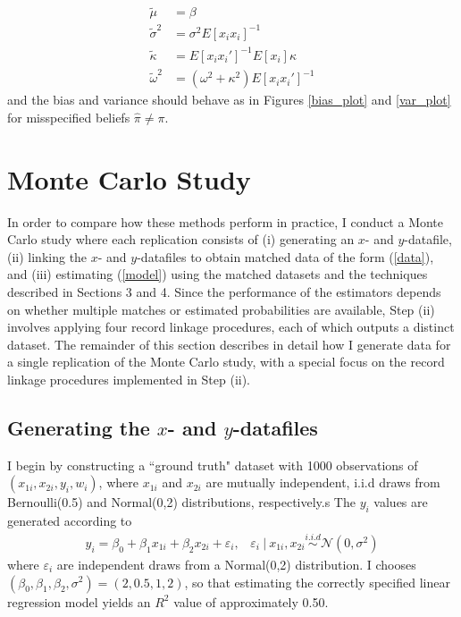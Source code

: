 \documentclass[12pt]{article}
\begin{document}
\begin{align*}
\tilde{\mu} &= \beta \\
\tilde{\sigma}^2 &=  \sigma^2 E[x_ix_i]^{-1}\\
\tilde{\kappa} &= E[x_ix_i']^{-1}E[x_i]\kappa \\
\tilde{\omega}^2 &= (\omega^2 + \kappa^2)E[x_ix_i']^{-1}
\end{align*}
and the bias and variance should behave as in Figures \ref{bias_plot} and \ref{var_plot} for misspecified beliefs $\hat{\pi} \neq \pi$.

\section{Monte Carlo Study}

In order to compare how these methods perform in practice, I conduct a Monte Carlo study where each replication consists of (i) generating an $x$- and $y$-datafile, (ii) linking the $x$- and $y$-datafiles to obtain matched data of the form (\ref{data}), and (iii) estimating (\ref{model}) using the matched datasets and the techniques described in Sections 3 and 4.  Since the performance of the estimators depends on whether multiple matches or estimated probabilities are available, Step (ii) involves applying four record linkage procedures, each of which outputs a distinct dataset.  The remainder of this section describes in detail how I generate data for a single replication of the Monte Carlo study, with a special focus on the record linkage procedures implemented in Step (ii).  

\subsection{Generating the $x$- and $y$-datafiles}

I begin by constructing a ``ground truth" dataset with 1000 observations of $(x_{1i}, x_{2i}, y_i, w_i)$, where $x_{1i}$ and $x_{2i}$ are mutually independent, i.i.d draws from Bernoulli(0.5) and Normal(0,2) distributions, respectively.s  The $y_i$ values are generated according to \begin{gather}
y_i = \beta_0 + \beta_1 x_{1i} + \beta_2 x_{2i} + \varepsilon_i, \hspace{10pt} 
\varepsilon_i\  |\  x_{1i}, x_{2i} \overset{i.i.d}{\sim} \mathcal{N}(0, \sigma^2) 
\end{gather}
where $\varepsilon_i$ are independent draws from a Normal(0,2) distribution.  I chooses $(\beta_0, \beta_1, \beta_2, \sigma^2) = (2, 0.5, 1, 2)$, so that estimating the correctly specified linear regression model yields an $R^2$ value of approximately 0.50.  
\end{document}
